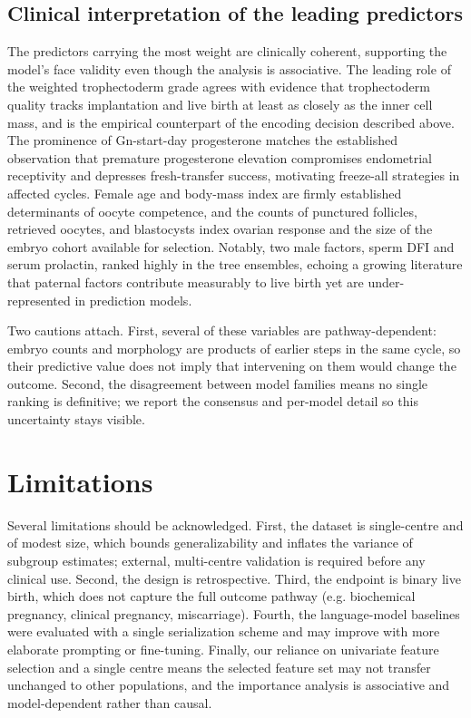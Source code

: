 \documentclass[12pt,a4paper]{article}
\begin{document}
\subsection*{Clinical interpretation of the leading predictors}

The predictors carrying the most weight are clinically coherent, supporting the model's face validity even though the analysis is associative. The leading role of the weighted trophectoderm grade agrees with evidence that trophectoderm quality tracks implantation and live birth at least as closely as the inner cell mass, and is the empirical counterpart of the encoding decision described above. The prominence of Gn-start-day progesterone matches the established observation that premature progesterone elevation compromises endometrial receptivity and depresses fresh-transfer success, motivating freeze-all strategies in affected cycles. Female age and body-mass index are firmly established determinants of oocyte competence, and the counts of punctured follicles, retrieved oocytes, and blastocysts index ovarian response and the size of the embryo cohort available for selection. Notably, two male factors, sperm DFI and serum prolactin, ranked highly in the tree ensembles, echoing a growing literature that paternal factors contribute measurably to live birth yet are under-represented in prediction models.

Two cautions attach. First, several of these variables are pathway-dependent: embryo counts and morphology are products of earlier steps in the same cycle, so their predictive value does not imply that intervening on them would change the outcome. Second, the disagreement between model families means no single ranking is definitive; we report the consensus and per-model detail so this uncertainty stays visible.

\section*{Limitations}

Several limitations should be acknowledged. First, the dataset is single-centre and of modest size, which bounds generalizability and inflates the variance of subgroup estimates; external, multi-centre validation is required before any clinical use. Second, the design is retrospective. Third, the endpoint is binary live birth, which does not capture the full outcome pathway (e.g. biochemical pregnancy, clinical pregnancy, miscarriage). Fourth, the language-model baselines were evaluated with a single serialization scheme and may improve with more elaborate prompting or fine-tuning. Finally, our reliance on univariate feature selection and a single centre means the selected feature set may not transfer unchanged to other populations, and the importance analysis is associative and model-dependent rather than causal.
\end{document}
